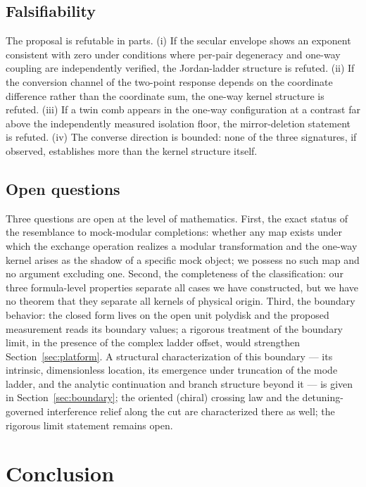 \documentclass[11pt,a4paper]{article}
\begin{document}
\subsection{Falsifiability}

The proposal is refutable in parts. (i) If the secular envelope shows an
exponent consistent with zero under conditions where per-pair degeneracy and
one-way coupling are independently verified, the Jordan-ladder structure is
refuted. (ii) If the conversion channel of the two-point response depends on
the coordinate difference rather than the coordinate sum, the one-way kernel
structure is refuted. (iii) If a twin comb appears in the one-way configuration
at a contrast far above the independently measured isolation floor, the
mirror-deletion statement is refuted. (iv) The converse direction is bounded:
none of the three signatures, if observed, establishes more than the kernel
structure itself.

\subsection{Open questions}

Three questions are open at the level of mathematics. First, the exact status
of the resemblance to mock-modular completions: whether any map exists under
which the exchange operation realizes a modular transformation and the one-way
kernel arises as the shadow of a specific mock object; we possess no such map
and no argument excluding one. Second, the completeness of the classification:
our three formula-level properties separate all cases we have constructed, but
we have no theorem that they separate all kernels of physical origin. Third,
the boundary behavior: the closed form lives on the open unit polydisk and the
proposed measurement reads its boundary values; a rigorous treatment of the
boundary limit, in the presence of the complex ladder offset, would strengthen
Section~\ref{sec:platform}. A structural characterization of this boundary --- its intrinsic, dimensionless location, its emergence under truncation of the mode ladder, and the analytic continuation and branch structure beyond it --- is given in Section~\ref{sec:boundary}; the oriented (chiral) crossing law and the detuning-governed interference relief along the cut are characterized there as well; the rigorous limit statement remains open.

\section{Conclusion}
\end{document}
